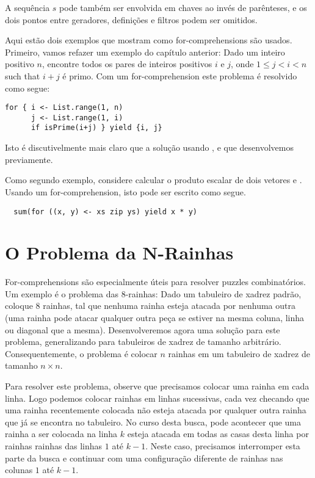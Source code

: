 A sequência $s$ pode também ser envolvida em chaves ao invés de parênteses, e os dois pontos 
entre geradores, definições e filtros podem ser omitidos. 

Aqui estão dois exemplos que mostram como for-comprehensions são usados. Primeiro, vamos refazer um 
exemplo do capítulo anterior: Dado um inteiro positivo $n$, encontre todos os pares de inteiros 
positivos $i$ e $j$, onde $1 \leq j < i < n$ such that $i + j$ é primo. Com um for-comprehension
este problema é resolvido como segue:
\begin{lstlisting}
for { i <- List.range(1, n)
      j <- List.range(1, i)
      if isPrime(i+j) } yield {i, j}
\end{lstlisting}

Isto é discutivelmente mais claro que a solução usando ,  e 
que desenvolvemos previamente.

Como segundo exemplo, considere calcular o produto escalar de dois vetores  e . 
Usando um for-comprehension, isto pode ser escrito como segue.
\begin{lstlisting}
  sum(for ((x, y) <- xs zip ys) yield x * y)
\end{lstlisting}

\section{O Problema da N-Rainhas}

For-comprehensions são especialmente úteis para resolver puzzles combinatórios. Um exemplo é o problema 
das $8$-rainhas: Dado um tabuleiro de xadrez padrão, coloque $8$ rainhas, tal que nenhuma rainha
esteja atacada por nenhuma outra (uma rainha pode atacar qualquer outra peça se estiver na mesma coluna, 
linha ou diagonal que a mesma). Desenvolveremos agora uma solução para este problema, generalizando 
para tabuleiros de xadrez de tamanho arbitrário. Consequentemente, o problema é colocar $n$ rainhas 
em um tabuleiro de xadrez de tamanho $n \times n$.

Para resolver este problema, observe que precisamos colocar uma rainha em cada linha. 
Logo podemos colocar rainhas em linhas sucessivas, cada vez checando que uma rainha recentemente colocada
não esteja atacada por qualquer outra rainha que já se encontra no tabuleiro. No curso desta busca, pode 
acontecer que uma rainha a ser colocada na linha $k$ esteja atacada em todas as casas desta linha por rainhas
rainhas das linhas $1$ até $k-1$. Neste caso, precisamos interromper esta parte da busca e continuar com uma 
configuração diferente de rainhas nas colunas $1$ até $k-1$.

